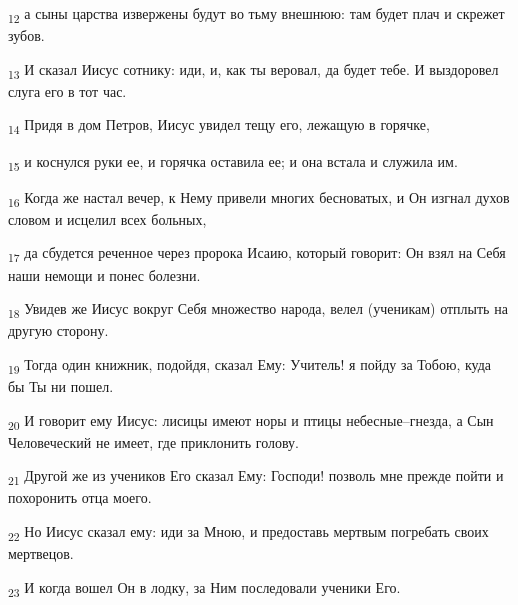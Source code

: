 \begin{tcolorbox}
\textsubscript{12} а сыны царства извержены будут во тьму внешнюю: там будет плач и скрежет зубов.
\end{tcolorbox}
\begin{tcolorbox}
\textsubscript{13} И сказал Иисус сотнику: иди, и, как ты веровал, да будет тебе. И выздоровел слуга его в тот час.
\end{tcolorbox}
\begin{tcolorbox}
\textsubscript{14} Придя в дом Петров, Иисус увидел тещу его, лежащую в горячке,
\end{tcolorbox}
\begin{tcolorbox}
\textsubscript{15} и коснулся руки ее, и горячка оставила ее; и она встала и служила им.
\end{tcolorbox}
\begin{tcolorbox}
\textsubscript{16} Когда же настал вечер, к Нему привели многих бесноватых, и Он изгнал духов словом и исцелил всех больных,
\end{tcolorbox}
\begin{tcolorbox}
\textsubscript{17} да сбудется реченное через пророка Исаию, который говорит: Он взял на Себя наши немощи и понес болезни.
\end{tcolorbox}
\begin{tcolorbox}
\textsubscript{18} Увидев же Иисус вокруг Себя множество народа, велел (ученикам) отплыть на другую сторону.
\end{tcolorbox}
\begin{tcolorbox}
\textsubscript{19} Тогда один книжник, подойдя, сказал Ему: Учитель! я пойду за Тобою, куда бы Ты ни пошел.
\end{tcolorbox}
\begin{tcolorbox}
\textsubscript{20} И говорит ему Иисус: лисицы имеют норы и птицы небесные--гнезда, а Сын Человеческий не имеет, где приклонить голову.
\end{tcolorbox}
\begin{tcolorbox}
\textsubscript{21} Другой же из учеников Его сказал Ему: Господи! позволь мне прежде пойти и похоронить отца моего.
\end{tcolorbox}
\begin{tcolorbox}
\textsubscript{22} Но Иисус сказал ему: иди за Мною, и предоставь мертвым погребать своих мертвецов.
\end{tcolorbox}
\begin{tcolorbox}
\textsubscript{23} И когда вошел Он в лодку, за Ним последовали ученики Его.
\end{tcolorbox}
